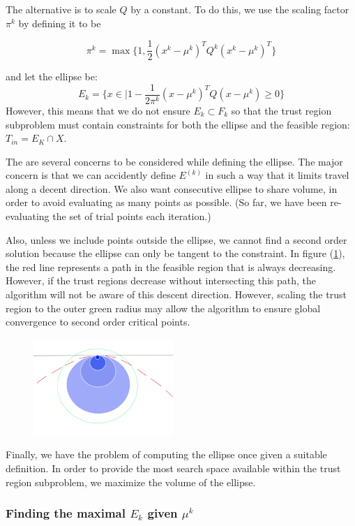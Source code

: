 \documentclass{article}
\theoremstyle{case}
\newcommand{\domain}{X}
\newcommand{\ellipsek}{{E^{(k)}}}
\let\oldref\ref
\renewcommand{\ref}[1]{(\oldref{#1})}
\begin{document}
The alternative is to scale $Q$ by a constant.
To do this, we use the scaling factor $\pi^k$ by defining it to be

$$\pi^k = \max \{1, \frac 1 {2} (x^{k} - \mu^{k})^T Q^k (x^{k} - \mu^{k})^T \}$$

and let the ellipse be:
$$E_k = \{x \in \mathbb | 1 - \frac 1 {2\pi^k} (x - \mu^{k})^T Q (x - \mu^{k}) \ge 0\} $$
However, this means that we do not ensure $E_k \subset F_k$ so that the trust region subproblem must contain constraints for both the ellipse and the feasible region: $T_{in} = E_K \cap \domain$.

The are several concerns to be considered while defining the ellipse.
The major concern is that we can accidently define $\ellipsek$ in such a way that it limits travel along a decent direction.
We also want consecutive ellipse to share volume, in order to avoid evaluating as many points as possible.
(So far, we have been re-evaluating the set of trial points each iteration.)


Also, unless we include points outside the ellipse, we cannot find a second order solution because the ellipse can only be tangent to the constraint.
In figure \ref{fbns}, the red line represents a path in the feasible region that is always decreasing.
However, if the trust regions decrease without intersecting this path, the algorithm will not be aware of this descent direction.
However, scaling the trust region to the outer green radius may allow the algorithm to ensure global convergence to second order critical points.

\begin{figure}[h]
    \centering
    \includegraphics[width=200px]{images/second_order_critical_point.png}
    \label{fbns}
\end{figure}



Finally, we have the problem of computing the ellipse once given a suitable definition.
In order to provide the most search space available within the trust region subproblem, we maximize the volume of the ellipse.

\subsubsection{Finding the maximal $E_k$ given $\mu^k$}
\end{document}
